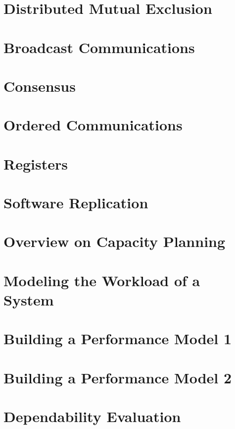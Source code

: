 	\newpage
	\section{Distributed Mutual Exclusion}
	
	
	\newpage
	\section{Broadcast Communications}
	
	\newpage
	\section{Consensus}
	
	\newpage
	\section{Ordered Communications}
	
	\newpage
	\section{Registers}
	
	\newpage
	\section{Software Replication}
	
	\newpage
	\section{Overview on Capacity Planning}
	
	\newpage
	\section{Modeling the Workload of a System}
	
	\newpage
	\section{Building a Performance Model 1}
	
	\newpage
	\section{Building a Performance Model 2}
	
	\newpage
	\section{Dependability Evaluation}
	
